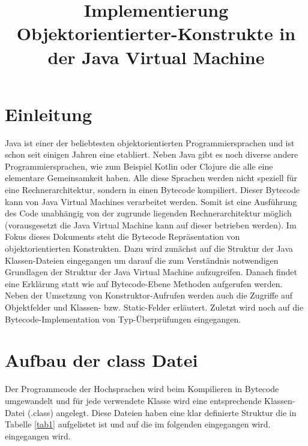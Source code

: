 \documentclass[conference]{IEEEtran}
\begin{document}
\title{Implementierung Objektorientierter-Konstrukte in der Java Virtual Machine\\}

\author{
}

\maketitle

\begin{abstract}

\end{abstract}



\section{Einleitung}
Java ist einer der beliebtesten objektorientierten Programmiersprachen und ist schon seit einigen Jahren eine etabliert. Neben Java gibt es noch diverse andere Programmiersprachen, wie zum Beispiel Kotlin oder Clojure die alle eine elementare Gemeinsamkeit haben. Alle diese Sprachen werden nicht speziell für eine Rechnerarchitektur, sondern in einen Bytecode kompiliert. Dieser Bytecode kann von Java Virtual Machines verarbeitet werden. Somit ist eine Ausführung des Code unabhängig von der zugrunde liegenden Rechnerarchitektur möglich (vorausgesetzt die Java Virtual Machine kann auf dieser betrieben werden). Im Fokus dieses Dokuments steht die Bytecode Repräsentation von objektorientierten Konstrukten. Dazu wird zunächst auf die Struktur der Java Klassen-Dateien eingegangen um darauf die zum Verständnis notwendigen Grundlagen der Struktur der Java Virtual Machine aufzugreifen. Danach findet eine Erklärung statt wie auf Bytecode-Ebene Methoden aufgerufen werden. Neben der Umsetzung von Konstruktor-Aufrufen werden auch die Zugriffe auf Objektfelder und Klassen- bzw. Static-Felder erläutert. Zuletzt wird noch auf die Bytecode-Implementation von Typ-Überprüfungen eingegangen.  

\section{Aufbau der class Datei}
Der Programmcode der Hochsprachen wird beim Kompilieren in Bytecode umgewandelt und für jede verwendete Klasse wird eine entsprechende Klassen-Datei (.class) angelegt. Diese Dateien haben eine klar definierte Struktur die in Tabelle \ref{tab1} aufgelistet ist und auf die im folgenden eingegangen wird. eingegangen wird.
\end{document}
